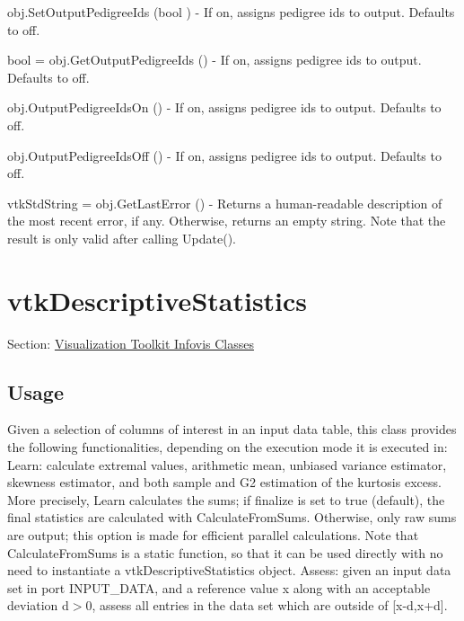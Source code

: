 \begin{DoxyItemize}
\item {\ttfamily obj.\-Set\-Output\-Pedigree\-Ids (bool )} -\/ If on, assigns pedigree ids to output. Defaults to off.  
\item {\ttfamily bool = obj.\-Get\-Output\-Pedigree\-Ids ()} -\/ If on, assigns pedigree ids to output. Defaults to off.  
\item {\ttfamily obj.\-Output\-Pedigree\-Ids\-On ()} -\/ If on, assigns pedigree ids to output. Defaults to off.  
\item {\ttfamily obj.\-Output\-Pedigree\-Ids\-Off ()} -\/ If on, assigns pedigree ids to output. Defaults to off.  
\item {\ttfamily vtk\-Std\-String = obj.\-Get\-Last\-Error ()} -\/ Returns a human-\/readable description of the most recent error, if any. Otherwise, returns an empty string. Note that the result is only valid after calling Update().  
\end{DoxyItemize}\hypertarget{vtkinfovis_vtkdescriptivestatistics}{}\section{vtk\-Descriptive\-Statistics}\label{vtkinfovis_vtkdescriptivestatistics}
Section\-: \hyperlink{sec_vtkinfovis}{Visualization Toolkit Infovis Classes} \hypertarget{vtkwidgets_vtkxyplotwidget_Usage}{}\subsection{Usage}\label{vtkwidgets_vtkxyplotwidget_Usage}
Given a selection of columns of interest in an input data table, this class provides the following functionalities, depending on the execution mode it is executed in\-: Learn\-: calculate extremal values, arithmetic mean, unbiased variance estimator, skewness estimator, and both sample and G2 estimation of the kurtosis excess. More precisely, Learn calculates the sums; if {\ttfamily finalize} is set to true (default), the final statistics are calculated with Calculate\-From\-Sums. Otherwise, only raw sums are output; this option is made for efficient parallel calculations. Note that Calculate\-From\-Sums is a static function, so that it can be used directly with no need to instantiate a vtk\-Descriptive\-Statistics object. Assess\-: given an input data set in port I\-N\-P\-U\-T\-\_\-\-D\-A\-T\-A, and a reference value x along with an acceptable deviation d$>$0, assess all entries in the data set which are outside of \mbox{[}x-\/d,x+d\mbox{]}.

